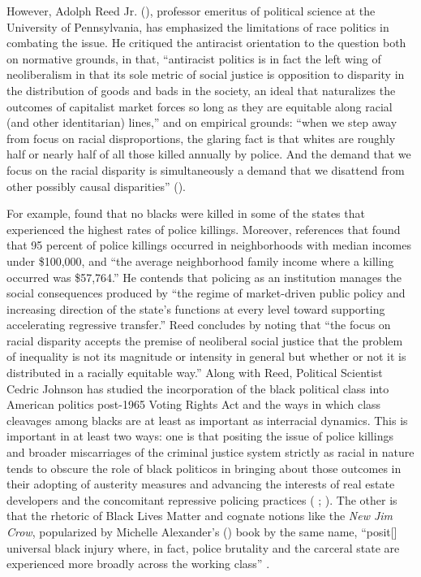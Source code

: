 \documentclass[12pt]{article}
\begin{document}
However, Adolph Reed Jr. (\citeyear{reedHowRacialDisparity2016}), professor emeritus of political science at the University of Pennsylvania, has emphasized the limitations of race politics in combating the issue. He critiqued the antiracist orientation to the question both on normative grounds, in that, “antiracist politics is in fact the left wing of neoliberalism in that its sole metric of social justice is opposition to disparity in the distribution of goods and bads in the society, an ideal that naturalizes the outcomes of capitalist market forces so long as they are equitable along racial (and other identitarian) lines,” and on empirical grounds: “when we step away from focus on racial disproportions, the glaring fact is that whites are roughly half or nearly half of all those killed annually by police. And the demand that we focus on the racial disparity is simultaneously a demand that we disattend from other possibly causal disparities” (\cite{reedHowRacialDisparity2016}).

For example, \textcite{reedHowRacialDisparity2016} found that no blacks were killed in some of the states that experienced the highest rates of police killings. Moreover, \textcite{reedHowRacialDisparity2016} references that \parencite{jilani95PoliceKillings2015} found that 95 percent of police killings occurred in neighborhoods with median incomes under \$100,000, and “the average neighborhood family income where a killing occurred was \$57,764.” He contends that policing as an institution manages the social consequences produced by “the regime of market-driven public policy and increasing direction of the state’s functions at every level toward supporting accelerating regressive transfer.” Reed concludes by noting that “the focus on racial disparity accepts the premise of neoliberal social justice that the problem of inequality is not its magnitude or intensity in general but whether or not it is distributed in a racially equitable way.” Along with Reed, Political Scientist Cedric Johnson has studied the incorporation of the black political class into American politics post-1965 Voting Rights Act and the ways in which class cleavages among blacks are at least as important as interracial dynamics. This is important in at least two ways: one is that positing the issue of police killings and broader miscarriages of the criminal justice system strictly as racial in nature tends to obscure the role of black politicos in bringing about those outcomes in their adopting of austerity measures and advancing the interests of real estate developers and the concomitant repressive policing practices (\citeauthor{johnsonAfterwordBaltimorePolicing2016} \citeyear[305]{johnsonAfterwordBaltimorePolicing2016}; \citeyear[179]{johnsonTrumpismPolicingProblem2019}). The other is that the rhetoric of Black Lives Matter and cognate notions like the \textit{New Jim Crow}, popularized by Michelle Alexander’s (\citeyear{alexanderNewJimCrow2010}) book by the same name, “posit[] universal black injury where, in fact, police brutality and the carceral state are experienced more broadly across the working class” \parencite*[317]{johnsonAfterwordBaltimorePolicing2016}.
\end{document}
